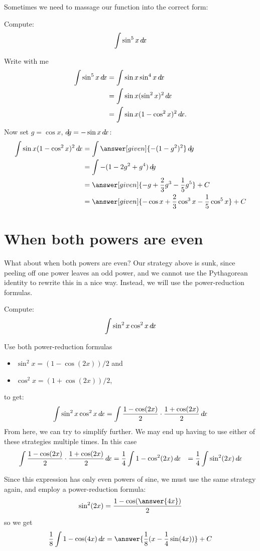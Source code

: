 \documentclass{ximera}
\begin{document}
Sometimes we need to massage our function into the correct form:

\begin{example}
  Compute:
  \[
  \int \sin^5 x \mathop{}\!d\! x
  \]
  \begin{explanation}
    Write with me
    \begin{align*}
      \int \sin^5 x\d x &=\int \sin x \sin^4 x\d x\\
      &= \int \sin x (\sin^2 x)^2\d x\\
      &= \int \sin x (1-\cos^2 x)^2\d x.
    \end{align*}
    Now set $g=\cos x$, $\mathop{}\!d\! g=-\sin x\mathop{}\!d\! x$:
    \begin{align*}
      \int \sin x (1-\cos^2 x)^2\d x&=\int \answer[given]{-(1-g^2)^2} \d g \\
      &=\int -(1-2g^2+g^4)\d g \\
      &=\answer[given]{-g+\frac{2}{3}g^3-\frac{1}{5}g^5}+C \\
      &=\answer[given]{-\cos x+\frac{2}{3}\cos^3 x-\frac{1}{5}\cos^5x}+C 
    \end{align*}
  \end{explanation}
\end{example}
  
\section{When both powers are even}

What about when both powers are even?  Our strategy above is sunk,
since peeling off one power leaves an odd power, and we cannot use the
Pythagorean identity to rewrite this in a nice way.  Instead, we will
use the power-reduction formulas.

\begin{example}
  Compute:
  \[
  \int \sin^2x\cos^2x\mathop{}\!d\! x
  \]
  \begin{explanation} 
    Use both power-reduction formulas
    \begin{itemize}
    \item $\sin^2x =(1-\cos(2x))/2$ and
    \item $\cos^2x =(1+\cos(2x))/2$,
    \end{itemize}
    to get:
    \[
    \int \sin^2x\cos^2x\mathop{}\!d\! x=\int \frac{1-\cos(2x)}{2}\cdot
    \frac{1+\cos(2x)}{2}\mathop{}\!d\! x
    \]
    From here, we can try to simplify further.  We may end up having
    to use either of these strategies multiple times.  In this case
    \begin{align*}
      \int \frac{1-\cos(2x)}{2} \cdot \frac{1+\cos(2x)}{2}\mathop{}\!d\! x &= \frac{1}{4} \int 1-\cos^2(2x) \mathop{}\!d\! x
      &= \frac{1}{4} \int \sin^2(2x) \mathop{}\!d\! x
    \end{align*}
    
    Since this expression has only even powers of sine, we must use
    the same strategy again, and employ a power-reduction formula:
    \[
    \sin^2(2x) = \frac{1-\cos(\answer{4x})}{2}
    \]
    so we get
    \[
    \frac{1}{8}\int 1-\cos(4x) \d x = \answer{\frac{1}{8}(x - \frac{1}{4}\sin(4x))} + C
    \]
  \end{explanation}
\end{example}
\end{document}
